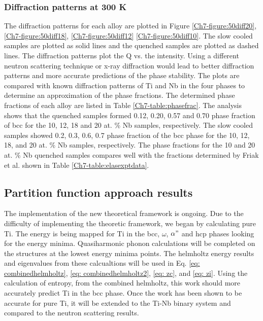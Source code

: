 \subsubsection{Diffraction patterns at 300 K}

The diffraction patterns for each alloy are plotted in Figure \ref{Ch7-figure:50diff20}, \ref{Ch7-figure:50diff18}, \ref{Ch7-figure:50diff12} \ref{Ch7-figure:50diff10}. The slow cooled samples are plotted as solid lines and the quenched samples are plotted as dashed lines. The diffraction patterns plot the Q vs. the intensity. Using a different neutron scattering technique or x-ray diffraction would lead to better diffraction patterns and more accurate predictions of the phase stability. The plots are compared with known diffraction patterns of Ti and Nb in the four phases to determine an approximation of the phase fractions. The determined phase fractions of each alloy are listed in Table \ref{Ch7-table:phasefrac}. The analysis shows that the quenched samples formed 0.12, 0.20, 0.57 and 0.70 phase fraction of bcc for the 10, 12, 18 and 20 at. \% Nb samples, respectively. The slow cooled samples showed 0.2, 0.3, 0.6, 0.7 phase fraction of the bcc phase for the 10, 12, 18, and 20 at. \% Nb samples, respectively. The phase fractions for the 10 and 20 at. \% Nb quenched samples compares well with the fractions determined by Friak et al. \cite{Friak2012} shown in Table \ref{Ch7-table:elasexptdata}. 

\subsection{Partition function approach results}

The implementation of the new theoretical framework is ongoing. Due to the difficulty of implementing the theoretic framework, we began by calculating pure Ti. The energy is being mapped for Ti in the bcc, $\omega$, $\alpha"$ and hcp phases looking for the energy minima. Quasiharmonic phonon calculations will be completed on the structures at the lowest energy minima points. The helmholtz energy results and eigenvalues from these calcualtions will be used in Eq. \ref{eq: combinedhelmholtz}, \ref{eq: combinedhelmholtz2}, \ref{eq: zc}, and \ref{eq: zi}. Using the calculation of entropy, from the combined helmholtz, this work should more accurately predict Ti in the bcc phase. Once the work has been shown to be accurate for pure Ti, it will be extended to the Ti-Nb binary system and compared to the neutron scattering results.

